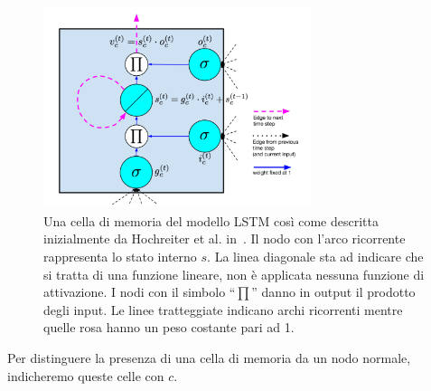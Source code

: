 \begin{figure}[tp]
  \centering
  \begin{center}
    \includegraphics[width=0.7\textwidth]{./images/memoryCell.png}
  \end{center}
  \caption{Una cella di memoria del modello LSTM cos\`i come descritta inizialmente da Hochreiter et al. in~\cite{Hochreiter:1997}.
  Il nodo con l'arco ricorrente rappresenta lo stato interno $s$.
  La linea diagonale sta ad indicare che si tratta di una funzione lineare, non \`e applicata nessuna funzione di attivazione.
  I nodi con il simbolo ``$\prod$'' danno in output il prodotto degli input.
  Le linee tratteggiate indicano archi ricorrenti mentre quelle rosa hanno un peso costante pari ad 1.}
  \label{fig:memoryCell}
\end{figure}

Per distinguere la presenza di una cella di memoria da un nodo normale, indicheremo queste celle con $c$.

